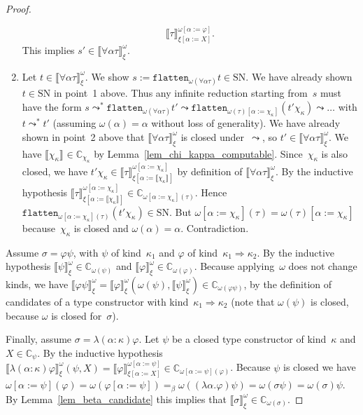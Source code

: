 \documentclass[a4paper,UKenglish,cleveref,autoref,numberwithinsect]{lipics-v2019}
\theoremstyle{definition}
\newcommand{\arrkind}{\Rightarrow}
\newcommand{\subst}[2]{#1:=#2}
\newcommand{\arrW}{\leadsto}
\newcommand{\flatten}{\mathtt{flatten}}
\newcommand{\SN}{\mathrm{SN}}
\newcommand{\Cb}{\mathbb{C}}
\newcommand{\val}[3]{\ensuremath{\llbracket#1\rrbracket_{#2}^{#3}}}
\begin{document}
\begin{proof}
\begin{enumerate}
\[    \val{\tau}{\xi[\subst{\alpha}{X}]}{\omega[\subst{\alpha}{\varphi}]}.
    \]
    This implies $s' \in \val{\forall\alpha\tau}{\xi}{\omega}$.
  \item Let $t \in \val{\forall\alpha\tau}{\xi}{\omega}$. We show $s
    := \flatten_{\omega(\forall\alpha\tau)}t \in \SN$. We have
    already shown $t \in \SN$ in point~1 above. Thus any infinite
    reduction starting from~$s$ must have the form $s \arrW^*
    \flatten_{\omega(\forall\alpha\tau)}t' \arrW
    \flatten_{\omega(\tau)[\subst{\alpha}{\chi_\kappa}]}(t'
    \chi_\kappa) \arrW \ldots$ with $t \arrW^* t'$ (assuming
    $\omega(\alpha) = \alpha$ without loss of generality). We have
    already shown in point~2 above that
    $\val{\forall\alpha\tau}{\xi}{\omega}$ is closed
    under~$\arrW$, so $t' \in
    \val{\forall\alpha\tau}{\xi}{\omega}$. We have
    $\val{\chi_\kappa}{}{} \in \Cb_{\chi_\kappa}$ by
    Lemma~\ref{lem_chi_kappa_computable}. Since~$\chi_\kappa$ is also
    closed, we have $t' \chi_\kappa \in
    \val{\tau}{\xi[\subst{\alpha}{\val{\chi_\kappa}{}{}}]}{\omega[\subst{\alpha}{\chi_\kappa}]}$
    by definition of $\val{\forall\alpha\tau}{\xi}{\omega}$. By the
    inductive hypothesis
    $\val{\tau}{\xi[\subst{\alpha}{\val{\chi_\kappa}{}{}}]}{\omega[\subst{\alpha}{\chi_\kappa}]}
    \in \Cb_{\omega[\subst{\alpha}{\chi_\kappa}](\tau)}$. Hence
    $\flatten_{\omega[\subst{\alpha}{\chi_\kappa}](\tau)}(t'\chi_\kappa)\in\SN$. But
    $\omega[\subst{\alpha}{\chi_\kappa}](\tau) =
    \omega(\tau)[\subst{\alpha}{\chi_\kappa}]$ because~$\chi_\kappa$
    is closed and $\omega(\alpha) = \alpha$. Contradiction.
  \end{enumerate}

  Assume $\sigma = \varphi\psi$, with $\psi$ of kind~$\kappa_1$ and
  $\varphi$ of kind~$\kappa_1\arrkind\kappa_2$. By the inductive
  hypothesis $\val{\psi}{\xi}{\omega} \in \Cb_{\omega(\psi)}$ and
  $\val{\varphi}{\xi}{\omega} \in \Cb_{\omega(\varphi)}$. Because
  applying~$\omega$ does not change kinds, we have
  $\val{\varphi\psi}{\xi}{\omega} =
  \val{\varphi}{\xi}{\omega}(\omega(\psi), \val{\psi}{\xi}{\omega})
  \in \Cb_{\omega(\varphi\psi)}$, by the definition of candidates of a
  type constructor with kind~$\kappa_1\arrkind\kappa_2$ (note that
  $\omega(\psi)$ is closed, because $\omega$ is closed for~$\sigma$).

  Finally, assume $\sigma = \lambda(\alpha:\kappa)\varphi$. Let $\psi$
  be a closed type constructor of kind~$\kappa$ and $X \in
  \Cb_{\psi}$. By the inductive hypothesis
  $\val{\lambda(\alpha:\kappa)\varphi}{\xi}{\omega}(\psi,X) =
  \val{\varphi}{\xi[\subst{\alpha}{X}]}{\omega[\subst{\alpha}{\psi}]}
  \in \Cb_{\omega[\subst{\alpha}{\psi}](\varphi)}$. Because $\psi$ is
  closed we have $\omega[\subst{\alpha}{\psi}](\varphi) =
  \omega(\varphi[\subst{\alpha}{\psi}]) =_\beta
  \omega((\lambda\alpha.\varphi)\psi) = \omega(\sigma\psi) =
  \omega(\sigma)\psi$. By Lemma~\ref{lem_beta_candidate} this implies
  that $\val{\sigma}{\xi}{\omega} \in \Cb_{\omega(\sigma)}$.
\end{proof}
\end{document}
